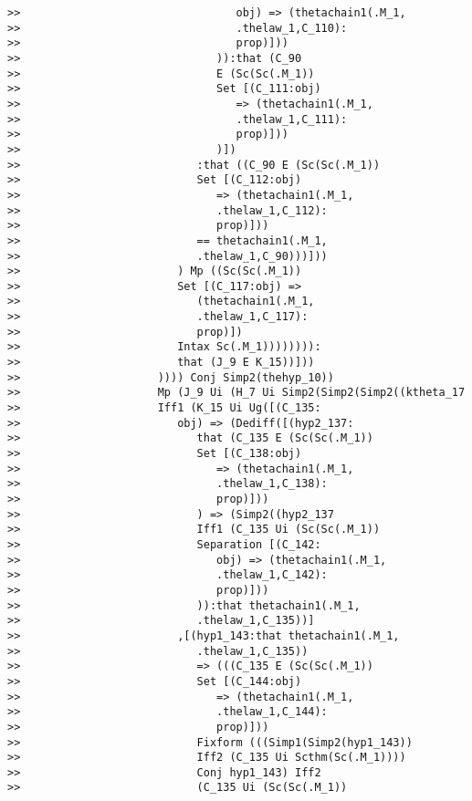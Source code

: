 \documentclass[12pt]{article}
\begin{document}
\begin{verbatim}
>>                                 obj) => (thetachain1(.M_1,
>>                                 .thelaw_1,C_110):
>>                                 prop)]))
>>                              )):that (C_90
>>                              E (Sc(Sc(.M_1))
>>                              Set [(C_111:obj)
>>                                 => (thetachain1(.M_1,
>>                                 .thelaw_1,C_111):
>>                                 prop)]))
>>                              )])
>>                           :that ((C_90 E (Sc(Sc(.M_1))
>>                           Set [(C_112:obj)
>>                              => (thetachain1(.M_1,
>>                              .thelaw_1,C_112):
>>                              prop)]))
>>                           == thetachain1(.M_1,
>>                           .thelaw_1,C_90)))]))
>>                        ) Mp ((Sc(Sc(.M_1))
>>                        Set [(C_117:obj) =>
>>                           (thetachain1(.M_1,
>>                           .thelaw_1,C_117):
>>                           prop)])
>>                        Intax Sc(.M_1)))))))):
>>                        that (J_9 E K_15))]))
>>                     )))) Conj Simp2(thehyp_10))
>>                     Mp (J_9 Ui (H_7 Ui Simp2(Simp2(Simp2((ktheta_17
>>                     Iff1 (K_15 Ui Ug([(C_135:
>>                        obj) => (Dediff([(hyp2_137:
>>                           that (C_135 E (Sc(Sc(.M_1))
>>                           Set [(C_138:obj)
>>                              => (thetachain1(.M_1,
>>                              .thelaw_1,C_138):
>>                              prop)]))
>>                           ) => (Simp2((hyp2_137
>>                           Iff1 (C_135 Ui (Sc(Sc(.M_1))
>>                           Separation [(C_142:
>>                              obj) => (thetachain1(.M_1,
>>                              .thelaw_1,C_142):
>>                              prop)]))
>>                           )):that thetachain1(.M_1,
>>                           .thelaw_1,C_135))]
>>                        ,[(hyp1_143:that thetachain1(.M_1,
>>                           .thelaw_1,C_135))
>>                           => (((C_135 E (Sc(Sc(.M_1))
>>                           Set [(C_144:obj)
>>                              => (thetachain1(.M_1,
>>                              .thelaw_1,C_144):
>>                              prop)]))
>>                           Fixform (((Simp1(Simp2(hyp1_143))
>>                           Iff2 (C_135 Ui Scthm(Sc(.M_1))))
>>                           Conj hyp1_143) Iff2
>>                           (C_135 Ui (Sc(Sc(.M_1))

\end{verbatim}
\end{document}
